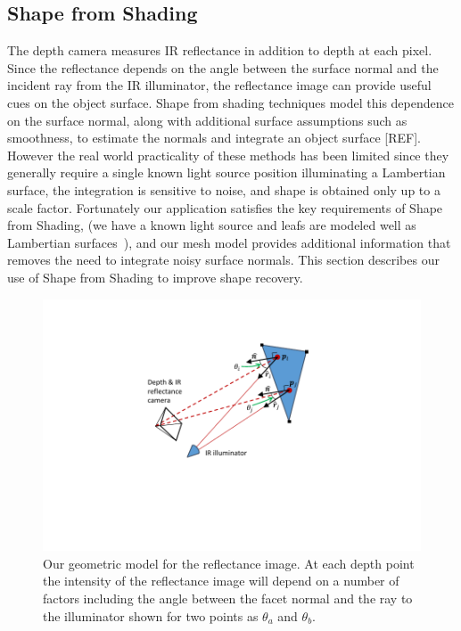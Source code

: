 \subsection{Shape from Shading}

The depth camera measures IR reflectance in addition to depth at each pixel.  Since the reflectance depends on the angle between the surface normal and the incident ray from the IR illuminator, the reflectance image can provide useful cues on the object surface.  Shape from shading techniques model this dependence on the surface normal, along with additional surface assumptions such as smoothness, to estimate the normals and integrate an object surface [REF].  However the real world practicality of these methods has been limited since they generally require a single known light source position illuminating a Lambertian surface, the integration is sensitive to noise, and shape is obtained only up to a scale factor.  Fortunately our application satisfies the key requirements of Shape from Shading, (we have a known light source and leafs are modeled well as Lambertian surfaces~\cite{Chelle2006219}), and our mesh model provides additional information that removes the need to integrate noisy surface normals.  This section describes our use of Shape from Shading to improve shape recovery.

\begin{figure}
\begin{center}
   \includegraphics[trim=100 100 100 40,clip,width=0.95\linewidth]{Figures/ShapeFromShading}
\end{center}
   \caption{Our geometric model for the reflectance image.  At each depth point the intensity of the reflectance image will depend on a number of factors including the angle between the facet normal and the ray to the illuminator shown for two points as $\theta_a$ and $\theta_b$. }
\label{fig:shapefromshading}
\end{figure}

